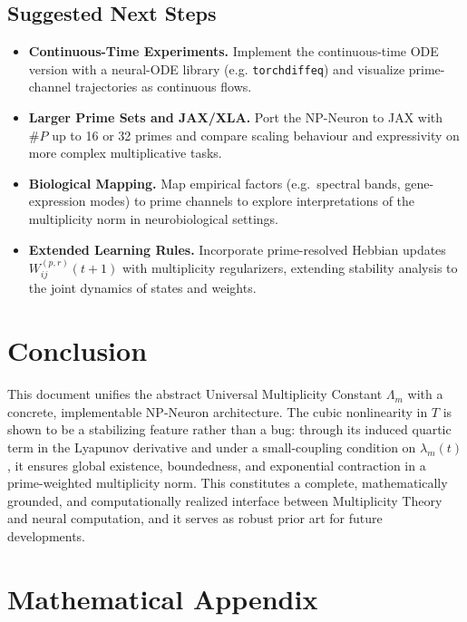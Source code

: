 \documentclass[11pt]{article}
\begin{document}
\subsection{Suggested Next Steps}

\begin{itemize}[leftmargin=*]
  \item \textbf{Continuous-Time Experiments.}
  Implement the continuous-time ODE version with a neural-ODE library (e.g. \texttt{torchdiffeq}) and visualize prime-channel trajectories as continuous flows.

  \item \textbf{Larger Prime Sets and JAX/XLA.}
  Port the NP-Neuron to JAX with \(\#P\) up to 16 or 32 primes and compare scaling behaviour and expressivity on more complex multiplicative tasks.

  \item \textbf{Biological Mapping.}
  Map empirical factors (e.g.\ spectral bands, gene-expression modes) to prime channels to explore interpretations of the multiplicity norm in neurobiological settings.

  \item \textbf{Extended Learning Rules.}
  Incorporate prime-resolved Hebbian updates \(W_{ij}^{(p,r)}(t+1)\) with multiplicity regularizers, extending stability analysis to the joint dynamics of states and weights.
\end{itemize}

\section*{Conclusion}

This document unifies the abstract Universal Multiplicity Constant \(\Lambda_m\) with a concrete, implementable NP-Neuron architecture. The cubic nonlinearity in \(T\) is shown to be a stabilizing feature rather than a bug: through its induced quartic term in the Lyapunov derivative and under a small-coupling condition on \(\lambda_m(t)\), it ensures global existence, boundedness, and exponential contraction in a prime-weighted multiplicity norm. This constitutes a complete, mathematically grounded, and computationally realized interface between Multiplicity Theory and neural computation, and it serves as robust prior art for future developments.

\appendix
\section*{Mathematical Appendix}
\end{document}
